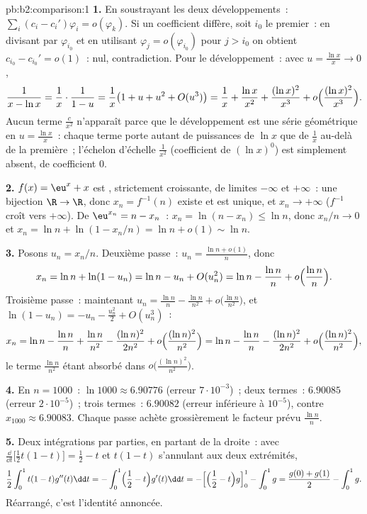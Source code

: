 \begin{solution}{pb:b2:comparison:1}
\textbf{1.} En soustrayant les deux développements~: $\sum_i (c_i -
c_i')\varphi_i = o(\varphi_k)$. Si un coefficient diffère, soit
$i_0$ le premier~: en divisant par $\varphi_{i_0}$ et en utilisant
$\varphi_j = o(\varphi_{i_0})$ pour $j > i_0$ on obtient $c_{i_0} -
c_{i_0}' = o(1)$~: nul, contradiction. Pour le développement~: avec
$u = \frac{\ln x}x \to 0$,
\[
\frac{1}{x - \ln x} = \frac1x\cdot\frac{1}{1 - u}
= \frac1x\bigl(1 + u + u^2 + O(u^3)\bigr)
= \frac1x + \frac{\ln x}{x^2} + \frac{(\ln x)^2}{x^3} +
o\Bigl(\frac{(\ln x)^2}{x^3}\Bigr).
\]
Aucun terme $\frac c{x^2}$ n'apparaît parce que le développement est
une série géométrique en $u = \frac{\ln x}{x}$~: chaque terme porte
autant de puissances de $\ln x$ que de $\frac1x$ au-delà de la
première~; l'échelon d'échelle $\frac1{x^2}$ (coefficient de $(\ln
x)^0$) est simplement absent, de coefficient $0$.

\textbf{2.} $f(x) = \eu^x + x$ est , strictement
croissante, de limites $-\infty$ et $+\infty$~: une bijection
$\R \to \R$, donc $x_n = f^{-1}(n)$ existe et est unique, et
$x_n \to +\infty$ ($f^{-1}$ croît vers $+\infty$). De
$\eu^{x_n} = n - x_n$~: $x_n = \ln(n - x_n) \leq \ln n$, donc
$x_n/n \to 0$ et $x_n = \ln n + \ln(1 - x_n/n) = \ln n + o(1)
\sim \ln n$.

\textbf{3.} Posons $u_n = x_n/n$. Deuxième passe~: $u_n = \frac{\ln n
+ o(1)}{n}$, donc
\[
x_n = \ln n + \ln(1 - u_n) = \ln n - u_n + O(u_n^2)
= \ln n - \frac{\ln n}{n} + o\Bigl(\frac{\ln n}n\Bigr).
\]
Troisième passe~: maintenant $u_n = \frac{\ln n}{n} - \frac{\ln n}{n^2} +
o\bigl(\frac{\ln n}{n^2}\bigr)$, et $\ln(1 - u_n) = -u_n -
\frac{u_n^2}2 + O(u_n^3)$~:
\[
x_n = \ln n - \frac{\ln n}n + \frac{\ln n}{n^2}
- \frac{(\ln n)^2}{2n^2} + o\Bigl(\frac{(\ln
n)^2}{n^2}\Bigr)
= \ln n - \frac{\ln n}{n} - \frac{(\ln n)^2}{2n^2} +
o\Bigl(\frac{(\ln n)^2}{n^2}\Bigr),
\]
le terme $\frac{\ln n}{n^2}$ étant absorbé dans
$o\bigl(\frac{(\ln n)^2}{n^2}\bigr)$.

\textbf{4.} En $n = 1000$~: $\ln 1000 \approx 6.90776$ (erreur
$7\cdot10^{-3}$)~; deux termes~: $6.90085$ (erreur
$2\cdot10^{-5}$)~; trois termes~: $6.90082$ (erreur inférieure à
$10^{-5}$), contre $x_{1000} \approx 6.90083$. Chaque passe achète
grossièrement le facteur prévu $\frac{\ln n}{n}$.

\textbf{5.} Deux intégrations par parties, en partant de la droite~:
avec $\frac{\dd}{\dd t}\bigl[\tfrac12t(1-t)\bigr] = \tfrac12 -
t$ et $t(1-t)$ s'annulant aux deux extrémités,
\[
\frac12\int_0^1 t(1-t)g''(t)\dd t
= -\int_0^1\Bigl(\frac12 - t\Bigr)g'(t)\dd t
= -\Bigl[\Bigl(\frac12 - t\Bigr)g\Bigr]_0^1 - \int_0^1 g
= \frac{g(0) + g(1)}2 - \int_0^1 g .
\]
Réarrangé, c'est l'identité annoncée.


\end{solution}

